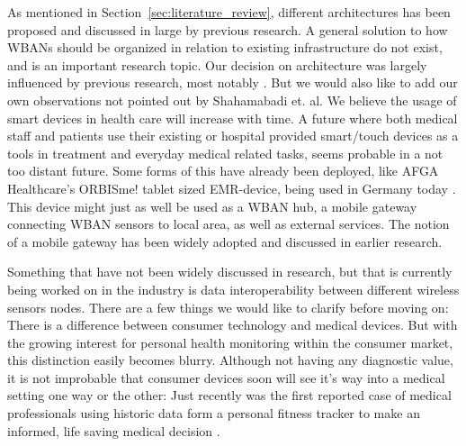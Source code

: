As mentioned in Section~\ref{sec:literature_review}, different architectures has been proposed and discussed in large by previous research. A general solution to how WBANs should be organized in relation to existing infrastructure do not exist, and is an important research topic. Our decision on architecture was largely influenced by previous research, most notably \cite{Shahamabadi:2013df}. But we would also like to add our own observations not pointed out by Shahamabadi et. al. 
We believe the usage of smart devices in health care will increase with time. A future where both medical staff and patients use their existing or hospital provided smart/touch devices as a tools in treatment and everyday medical related tasks, seems probable in a not too distant future. Some forms of this have already been deployed, like AFGA Healthcare's ORBISme! tablet sized EMR-device, being used in Germany today \cite{newRef_27_1}. This device might just as well be used as a WBAN hub, a mobile gateway connecting WBAN sensors to local area, as well as external services. The notion of a mobile gateway has been widely adopted and discussed \cite{Movassaghi:2014hi, Mohammed:2014dw, Touati:2015gy, EmilJovanov:2005ty} in earlier research.

Something that have not been widely discussed in research, but that is currently being worked on in the industry is data interoperability between different wireless sensors nodes. There are a few things we would like to clarify before moving on: There is a difference between consumer technology and medical devices. But with the growing interest for personal health monitoring within the consumer market, this distinction easily becomes blurry. Although not having any diagnostic value, it is not improbable that consumer devices soon will see it's way into a medical setting one way or the other: Just recently was the first reported case of medical professionals using historic data form a personal fitness tracker to make an informed, life saving medical decision \cite{newRef_29}.

